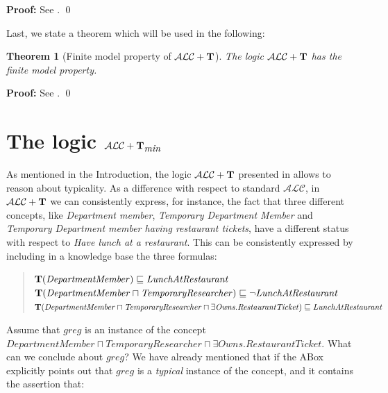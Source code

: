 \documentclass[a4paper, 11pt, oneside]{duthesis}
\newcommand{\tip}{{\bf T}}
\newcommand{\alc}{\mathcal{ALC}}
\newcommand{\alct}{\mathcal{ALC}+\tip}
\newcommand{\alctmin}{\mathcal{ALC}+\tip_{\mbox{\em min}}}
\newcommand{\nott} {\lnot}
\newcommand{\sqset}{\sqsubseteq}
\newcommand{\mint}{\sqcap}
\newenvironment{proof}
{\begin{trivlist} \item[] {\bf Proof:}}%
{\qed \end{trivlist}}
\newenvironment{proof}
{\begin{trivlist} \item[] {\bf Proof:}}%
{\qed \end{trivlist}}
\newtheorem{theorem}{Theorem}
\newcounter{posu}
\newtheorem{theorem}[posu]{Theorem}
\newtheorem{proof}[posu]{Proof}
\begin{document}
\begin{proof}
See \cite{Giordano:2013:NDL:2435476.2435957}.
\end{proof}


Last, we state a theorem which will be used in the following:

\begin{theorem}[Finite model property of $\alct$]\label{fmpALCT}
The logic $\alct$ has the finite model property.
\end{theorem}

\begin{proof}
See \cite{Giordano:2013:NDL:2435476.2435957}.
\end{proof}



\section{The logic $\alctmin$}\label{alctmin}

As mentioned in the Introduction, the logic $\alct$ presented in \cite{FI09} allows  to reason about typicality.
As a difference with respect to standard $\alc$, in $\alct$ we can consistently express, for instance, the fact that three different concepts, like {\em Department member}, {\em Temporary Department Member} and {\em Temporary Department member having restaurant tickets}, have a different status with respect to {\em Have lunch at a restaurant}. This can be consistently expressed by including in a knowledge base the three formulas:

\begin{quote}
$\tip (\mathit{DepartmentMember}) \sqset \mathit{LunchAtRestaurant}$\\
$\tip (\mathit{DepartmentMember} \mint \mathit{TemporaryResearcher})  \sqset \nott \mathit{LunchAtRestaurant}$\\
$\tip (\mathit{DepartmentMember} \mint \mathit{TemporaryResearcher} \mint \exists \mathit{Owns}.\mathit{RestaurantTicket})  \sqset \mathit{LunchAtRestaurant}$
\end{quote}

\noindent Assume that $\mathit{greg}$ is an instance of the concept
$\mathit{DepartmentMember} \sqcap \mathit{TemporaryResearcher} \sqcap \exists \mathit{Owns}.\mathit{RestaurantTicket}$. What can we conclude about
$\mathit{\mathit{greg}}$? We have already mentioned that if the ABox explicitly points out that $\mathit{greg}$ is a {\em typical} instance of the  concept, and it contains the assertion that:
\end{document}
